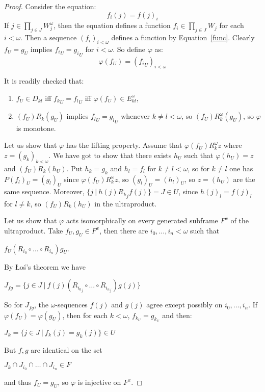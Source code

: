 \documentclass{article}
\theoremstyle{defin}
\theoremstyle{theorem}
\theoremstyle{claim}
\theoremstyle{prop}
\theoremstyle{lemma}
\theoremstyle{fact}
\theoremstyle{remark}
\theoremstyle{ex}
\theoremstyle{col}
\theoremstyle{question}
\let\strokeL\L
\renewcommand\L{\mathbf{L}}
\begin{document}
\begin{proof}
Consider the equation:
\begin{equation} \label{func}
f_i(j) = f{(j)}_i
\end{equation}
If $j \in \prod \limits_{j \in J} W^{\omega}_{j}$, 
then the equation defines a function $f_i \in \prod_{j \in J} W_j$ for each $i < \omega$. 
Then a sequence ${(f_i)}_{i < \omega}$ defines a function by Equation~\ref{func}. 
Clearly $f_U = g_U$ implies ${f_i}_U = {g_i}_U$ for $i < \omega$. So define $\varphi$ as:
\begin{equation}
\varphi(f_U) = {({f_i}_U)}_{i < \omega}
\end{equation}

It is readily checked that:
\begin{enumerate}
\item $f_U \in D_{k l}$ iff ${f_k}_U = {f_l}_U$ iff $\varphi(f_U) \in E^{\omega}_{k l}$,
\item $(f_U) R_k (g_U)$ implies ${f_l}_U = {g_l}_U$ 
whenever $k \neq l < \omega$, so $(f_U) R^{\omega}_k (g_U)$, so $\varphi$ is monotone.
\end{enumerate}
Let us show that $\varphi$ has the lifting property. Assume that $\varphi(f_U) R^{\omega}_k z$ 
where $z = {(g_k)}_{k < \omega}$. We have got to show that there exists $h_U$ such that 
$\varphi(h_U) = z$ and $(f_U) R_k (h_U)$. Put $h_k = g_k$ and $h_l = f_l$ for $k \neq l < \omega$, 
so for $k \neq l$ one has $P{(f_l)}_U = {(g_l)}_U$ since $\varphi(f_U) R^{\omega}_k z$, 
so ${(g_l)}_U = {(h_l)}_U$, so $z = (h_U)$ are the same sequence. 
Moreover, $\{ j \: | \: h(j) {R_k}_j f(j)\} = J \in U$, 
since ${h(j)}_l = {f(j)}_l$ for $l \neq k$, so $(f_U) R_k (h_U)$ in the ultraproduct.

\vspace{\baselineskip}

Let us show that $\varphi$ acts isomorphically on every generated subframe $F^{x}$ of the ultraproduct.
Take $f_U, g_U \in F^{x}$, then there are $i_0, \dots, i_n < \omega$ such that
\begin{center}
$f_U(R_{i_0} \circ \dots \circ R_{i_n})g_U$.
\end{center}
By \strokeL o\'s's theorem we have
\begin{center}
$J_{fg} = \{ j \in J \: | \: f(j)(R_{{i_0}_j} \circ \dots \circ R_{{i_n}_j})g(j) \}$
\end{center}
So for $J_{fg}$, the $\omega$-sequences $f(j)$ and $g(j)$ agree except possibly on $i_0, \dots, i_n$. 
If $\varphi(f_U) = \varphi(g_U)$, then for each $k < \omega$, $f_{k_U} = g_{k_U}$ and then:
\begin{center}
$J_k = \{ j \in J \: | \: f_k(j) = g_k(j) \} \in U$
\end{center}
But $f, g$ are identical on the set
\begin{center}
$J_k \cap J_{i_0} \cap \dots \cap J_{i_n} \in F$
\end{center}
and thus $f_U = g_U$, so $\varphi$ is injective on $F^{x}$.
\end{proof}
\end{document}
